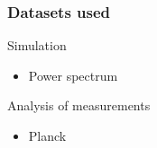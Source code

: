\begin{frame}
\frametitle{Datasets used}

\begin{block}{Simulation}
	\begin{itemize}
		\item Power spectrum
	\end{itemize}
\end{block}

\begin{alertblock}{Analysis of measurements}
	\begin{itemize}
		\item Planck
	\end{itemize}
\end{alertblock}

\end{frame}
